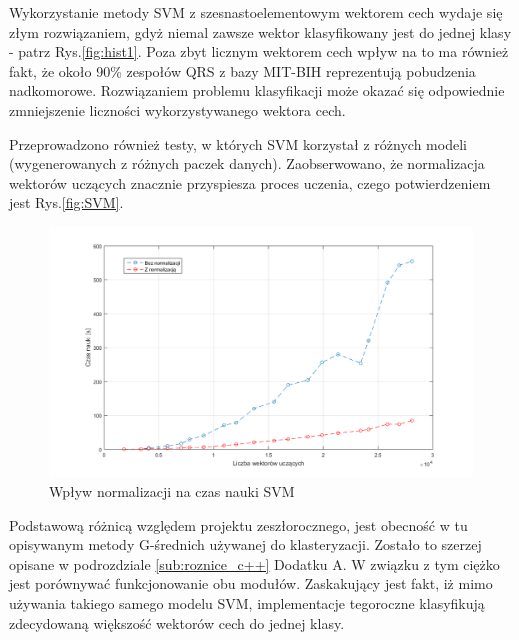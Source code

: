 Wykorzystanie metody SVM z szesnastoelementowym wektorem cech wydaje się złym rozwiązaniem, gdyż niemal zawsze wektor klasyfikowany jest do jednej klasy - patrz Rys.\ref{fig:hist1}. Poza zbyt licznym wektorem cech wpływ na to ma również fakt, że około 90\% zespołów QRS z bazy MIT-BIH reprezentują pobudzenia nadkomorowe. Rozwiązaniem problemu klasyfikacji może okazać się odpowiednie zmniejszenie liczności wykorzystywanego wektora cech.

Przeprowadzono również testy, w których SVM korzystał z różnych modeli (wygenerowanych z różnych paczek danych). Zaobserwowano, że normalizacja wektorów uczących znacznie przyspiesza proces uczenia, czego potwierdzeniem jest Rys.\ref{fig:SVM}.

\begin{figure}[!htp]
	\centering
	\includegraphics[width=15cm]{Grafika/SVMTrain}
	\caption{Wpływ normalizacji na czas nauki SVM}
	\label{fig:TrainNormSVM}
\end{figure}

Podstawową różnicą względem projektu zeszłorocznego, jest obecność w tu opisywanym metody G-średnich używanej do klasteryzacji. Zostało to szerzej opisane w podrozdziale \ref{sub:roznice_c++} Dodatku A. W związku z tym ciężko jest porównywać funkcjonowanie obu modułów. Zaskakujący jest fakt, iż mimo używania takiego samego modelu SVM, implementacje tegoroczne klasyfikują zdecydowaną większość wektorów cech do jednej klasy.
